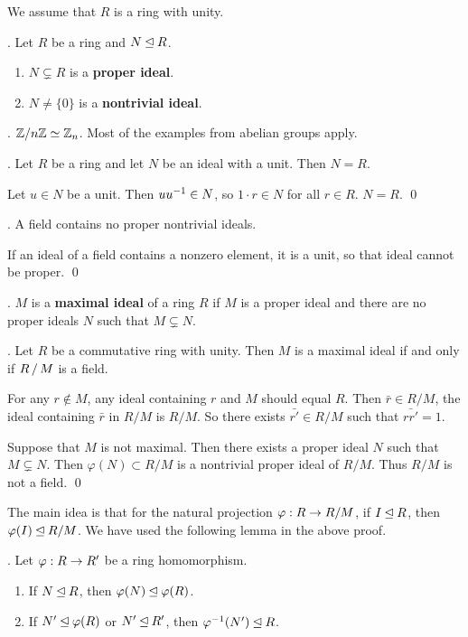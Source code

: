 
We assume that \(R\) is a ring with unity.

. Let \(R\) be a ring and \(N \unlhd R\).
\begin{enumerate}
    \item \(N \subsetneq R\) is a \textbf{proper ideal}.
    \item \(N \neq \{0\}\) is a \textbf{nontrivial ideal}.
\end{enumerate}

\ex. \(\mathbb{Z} / n\mathbb{Z} \simeq \mathbb{Z}_n\). Most of the examples from abelian groups apply.

\thm. Let \(R\) be a ring and let \(N\) be an ideal with a unit. Then \(N = R\).

\pf Let \(u \in N\) be a unit. Then \(u u^{-1} \in N\), so \(1\cdot r \in N\) for all \(r \in R\). \(N = R\). \qed

\cor. A field contains no proper nontrivial ideals.

\pf If an ideal of a field contains a nonzero element, it is a unit, so that ideal cannot be proper. \qed

.  \(M\) is a \textbf{maximal ideal} of a ring \(R\) if \(M\) is a proper ideal and there are no proper ideals \(N\) such that \(M \subsetneq N\).

\thm. Let \(R\) be a commutative ring with unity. Then \(M\) is a maximal ideal if and only if \(R\operatorname{/} M\) is a field.

\pf \note{\mimp} For any \(r \notin M\), any ideal containing \(r\) and \(M\) should equal \(R\). Then \(\bar{r} \in R/M\), the ideal containing \(\bar{r}\) in \(R/M\) is \(R/M\). So there exists \(\bar{r'} \in R/M\) such that \(\bar{rr'} = 1\).

\note{\mimpd} Suppose that \(M\) is not maximal. Then there exists a proper ideal \(N\) such that \(M \subsetneq N\). Then \(\varphi(N) \subset R/M\) is a nontrivial proper ideal of \(R/M\). Thus \(R/M\) is not a field. \qed

The main idea is that for the natural projection \(\varphi: R \rightarrow R/M\), if \(I \unlhd R\), then \(\varphi(I) \unlhd R/M\). We have used the following lemma in the above proof.

\lemma. Let \(\varphi : R \rightarrow R'\) be a ring homomorphism.
\begin{enumerate}
    \item If \(N \unlhd R\), then \(\varphi(N) \unlhd \varphi(R)\).
    \item If \(N' \unlhd \varphi(R)\) or \(N' \unlhd R'\), then \(\varphi^{-1}(N') \unlhd R\).
\end{enumerate}

